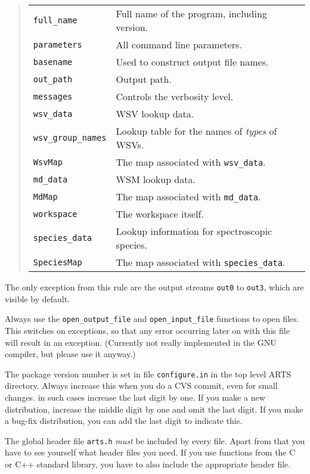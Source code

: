    \begin{quote}
   \begin{tabular}{ll}
   \verb|full_name|&         Full name of the program, including version.\\
   \verb|parameters|&        All command line parameters.\\
   \verb|basename|&          Used to construct output file names.\\
   \verb|out_path|&          Output path.\\
   \verb|messages|&          Controls the verbosity level.\\
   \verb|wsv_data|&          WSV lookup data.\\
   \verb|wsv_group_names|&   Lookup table for the names of \emph{types} of WSVs.\\
   \verb|WsvMap|&            The map associated with \verb|wsv_data|. \\
   \verb|md_data|&           WSM lookup data.\\
   \verb|MdMap|&             The map associated with \verb|md_data|. \\
   \verb|workspace|&         The workspace itself.\\
   \verb|species_data|&      Lookup information for spectroscopic species.\\
   \verb|SpeciesMap|&        The map associated with \verb|species_data|.
   \end{tabular}
   \end{quote}
   The only exception from this rule are the output streams \verb|out0| to
   \verb|out3|, which are visible by default.

Always use the \verb|open_output_file| and \verb|open_input_file|
functions to open files. This switches on exceptions, so that any
error occurring later on with this file will result in an
exception. (Currently not really implemented in the GNU compiler,
but please use it anyway.)

The package version number is set in file \verb|configure.in| in the
top level ARTS directory. Always increase this when you do a CVS
commit, even for small changes. in such cases increase the last digit
by one. If you make a new distribution, increase the middle digit by
one and omit the last digit. If you make a bug-fix distribution, you
can add the last digit to indicate this. 

The global header file \verb|arts.h| \emph{must} be included by every
file. Apart from that you have to see yourself what header files you
need. If you use functions from the C or C++ standard library, you
have to also include the appropriate header file.

